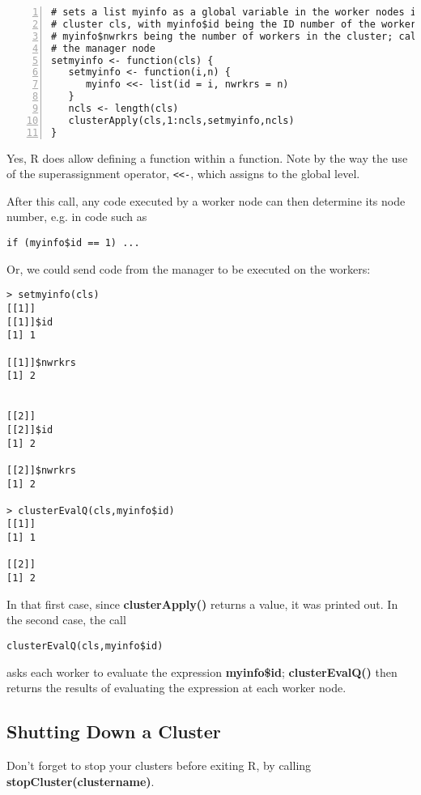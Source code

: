 \begin{lstlisting}[numbers=left]
# sets a list myinfo as a global variable in the worker nodes in the
# cluster cls, with myinfo$id being the ID number of the worker and
# myinfo$nwrkrs being the number of workers in the cluster; called from
# the manager node
setmyinfo <- function(cls) {
   setmyinfo <- function(i,n) {
      myinfo <<- list(id = i, nwrkrs = n)
   }
   ncls <- length(cls)
   clusterApply(cls,1:ncls,setmyinfo,ncls)
}
\end{lstlisting}

Yes, R does allow defining a function within a function.  Note by the
way the use of the superassignment operator, \verb#<<-#, which assigns
to the global level.

After this call, any code executed by a worker node can then determine
its node number, e.g. in code such as

\begin{lstlisting}
if (myinfo$id == 1) ...
\end{lstlisting}

Or, we could send code from the manager to be executed on the workers:

\begin{lstlisting}
> setmyinfo(cls)
[[1]]
[[1]]$id
[1] 1

[[1]]$nwrkrs
[1] 2


[[2]]
[[2]]$id
[1] 2

[[2]]$nwrkrs
[1] 2

> clusterEvalQ(cls,myinfo$id)
[[1]]
[1] 1

[[2]]
[1] 2
\end{lstlisting}

In that first case, since {\bf clusterApply()} returns a value, it was
printed out.  In the second case, the call

\begin{lstlisting}
clusterEvalQ(cls,myinfo$id)
\end{lstlisting}

asks each worker to evaluate the expression \textbf{myinfo\$id};
{\bf clusterEvalQ()} then returns the results of evaluating the
expression at each worker node.

\subsection{Shutting Down a Cluster}

Don't forget to stop your clusters before exiting R, by calling
{\bf stopCluster(clustername)}.

